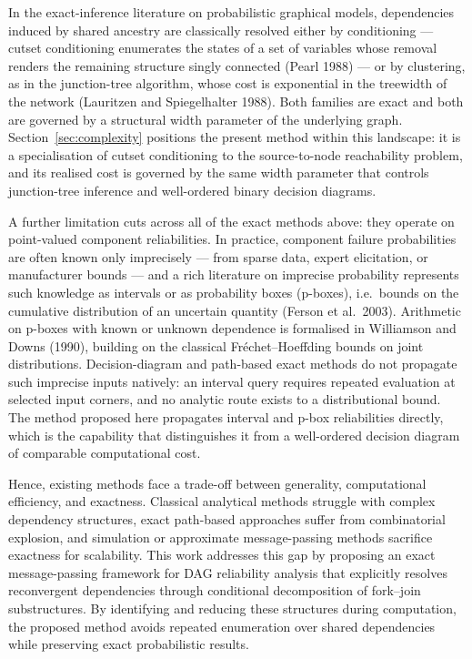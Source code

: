 \documentclass[preprint,12pt]{elsarticle}
\theoremstyle{definition}
\begin{document}
In the exact-inference literature on probabilistic graphical models, dependencies induced by shared
ancestry are classically resolved either by conditioning --- cutset conditioning enumerates the states of
a set of variables whose removal renders the remaining structure singly connected (Pearl 1988) --- or by
clustering, as in the junction-tree algorithm, whose cost is exponential in the treewidth of the network
(Lauritzen and Spiegelhalter 1988). Both families are exact and both are governed by a structural width
parameter of the underlying graph. Section~\ref{sec:complexity} positions the present method within this
landscape: it is a specialisation of cutset conditioning to the source-to-node reachability problem, and
its realised cost is governed by the same width parameter that controls junction-tree inference and
well-ordered binary decision diagrams.

A further limitation cuts across all of the exact methods above: they operate on point-valued component
reliabilities. In practice, component failure probabilities are often known only imprecisely --- from
sparse data, expert elicitation, or manufacturer bounds --- and a rich literature on imprecise
probability represents such knowledge as intervals or as probability boxes (p-boxes), i.e.\ bounds on the
cumulative distribution of an uncertain quantity (Ferson et al.\ 2003). Arithmetic on p-boxes with known
or unknown dependence is formalised in Williamson and Downs (1990), building on the classical
Fr\'echet--Hoeffding bounds on joint distributions. Decision-diagram and path-based exact methods do not
propagate such imprecise inputs natively: an interval query requires repeated evaluation at selected
input corners, and no analytic route exists to a distributional bound. The method proposed here
propagates interval and p-box reliabilities directly, which is the capability that distinguishes it from
a well-ordered decision diagram of comparable computational cost.

Hence, existing methods face a trade-off between generality, computational efficiency, and exactness.
Classical analytical methods struggle with complex dependency structures, exact path-based approaches
suffer from combinatorial explosion, and simulation or approximate message-passing methods sacrifice
exactness for scalability. This work addresses this gap by proposing an exact message-passing framework
for DAG reliability analysis that explicitly resolves reconvergent dependencies through conditional
decomposition of fork--join substructures. By identifying and reducing these structures during
computation, the proposed method avoids repeated enumeration over shared dependencies while preserving
exact probabilistic results.
\end{document}
